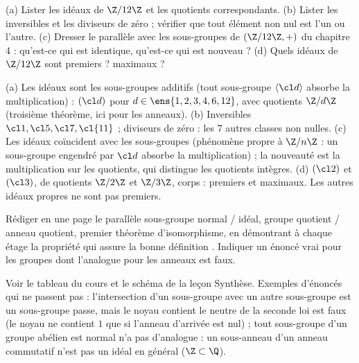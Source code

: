 \begin{exo}
(a) Lister les idéaux de $\Z/12\Z$ et les quotients correspondants. (b) Lister les inversibles et les diviseurs de zéro ; vérifier que tout élément non nul est l'un ou l'autre. (c) Dresser le parallèle avec les sous-groupes de $(\Z/12\Z,+)$ du chapitre 4 : qu'est-ce qui est identique, qu'est-ce qui est nouveau ? (d) Quels idéaux de $\Z/12\Z$ sont premiers ? maximaux ?
\begin{corrige}
(a) Les idéaux sont les sous-groupes additifs (tout sous-groupe $\langle\cl d\rangle$ absorbe la multiplication) : $(\cl d)$ pour $d\in\ens{1,2,3,4,6,12}$, avec quotients $\Z/d\Z$ (troisième théorème, ici pour les anneaux). (b) Inversibles $\cl1,\cl5,\cl7,\cl{11}$ ; diviseurs de zéro : les 7 autres classes non nulles. (c) Les idéaux coïncident avec les sous-groupes (phénomène propre à $\Z/n\Z$ : un sous-groupe engendré par $\cl d$ absorbe la multiplication) ; la nouveauté est la multiplication sur les quotients, qui distingue les quotients intègres. (d) $(\cl2)$ et $(\cl3)$, de quotients $\Z/2\Z$ et $\Z/3\Z$, corps : premiers et maximaux. Les autres idéaux propres ne sont pas premiers.
\end{corrige}
\end{exo}
\begin{exo}
Rédiger en une page le parallèle sous-groupe normal / idéal, groupe quotient / anneau quotient, premier théorème d'isomorphisme, en démontrant à chaque étage la propriété qui assure la \og bonne définition \fg. Indiquer un énoncé vrai pour les groupes dont l'analogue pour les anneaux est faux.
\begin{corrige}
Voir le tableau du cours et le schéma de la leçon Synthèse. Exemples d'énoncés qui ne passent pas : \og l'intersection d'un sous-groupe avec un autre sous-groupe est un sous-groupe \fg{} passe, mais \og le noyau contient le neutre de la seconde loi \fg{} est faux (le noyau ne contient $1$ que si l'anneau d'arrivée est nul) ; \og tout sous-groupe d'un groupe abélien est normal \fg{} n'a pas d'analogue : un sous-anneau d'un anneau commutatif n'est pas un idéal en général ($\Z\subset\Q$).
\end{corrige}
\end{exo}
